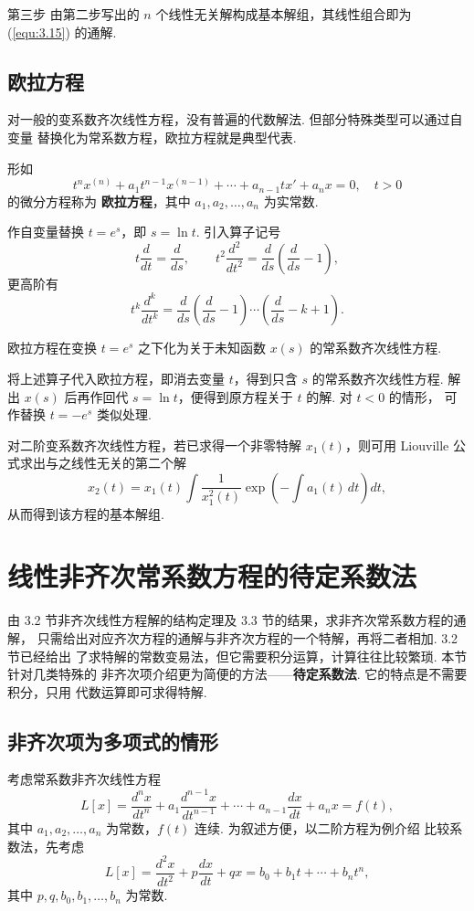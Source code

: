 第三步 由第二步写出的 $n$ 个线性无关解构成基本解组，其线性组合即为
(\ref{equ:3.15}) 的通解.

\subsection{欧拉方程}
对一般的变系数齐次线性方程，没有普遍的代数解法. 但部分特殊类型可以通过自变量
替换化为常系数方程，欧拉方程就是典型代表.

\begin{deff}[(欧拉方程)]
形如
\[
t^n x^{(n)}+a_1t^{n-1}x^{(n-1)}+\cdots+a_{n-1}tx'+a_nx=0,\quad t>0
\]
的微分方程称为 \textbf{欧拉方程}，其中 $a_1,a_2,\dots,a_n$ 为实常数.
\end{deff}

作自变量替换 $t=e^s$，即 $s=\ln t$. 引入算子记号
\[
t\frac{d}{dt}=\frac{d}{ds},\qquad
t^2\frac{d^2}{dt^2}=\frac{d}{ds}\left(\frac{d}{ds}-1\right),
\]
更高阶有
\[
t^k\frac{d^k}{dt^k}
=\frac{d}{ds}\left(\frac{d}{ds}-1\right)\cdots
\left(\frac{d}{ds}-k+1\right).
\]

\begin{thm}\label{thm:3.3.2}
欧拉方程在变换 $t=e^s$ 之下化为关于未知函数 $x(s)$ 的常系数齐次线性方程.
\end{thm}
\begin{pf1}
将上述算子代入欧拉方程，即消去变量 $t$，得到只含 $s$ 的常系数齐次线性方程.
解出 $x(s)$ 后再作回代 $s=\ln t$，便得到原方程关于 $t$ 的解. 对 $t<0$ 的情形，
可作替换 $t=-e^s$ 类似处理.
\end{pf1}

\begin{rmk}
对二阶变系数齐次线性方程，若已求得一个非零特解 $x_1(t)$，则可用 Liouville
公式求出与之线性无关的第二个解
\[
x_2(t)=x_1(t)\int\frac{1}{x_1^2(t)}
\exp\left(-\int a_1(t)\,dt\right)dt,
\]
从而得到该方程的基本解组.
\end{rmk}

\section{线性非齐次常系数方程的待定系数法}\label{sec:3.4}
由 3.2 节非齐次线性方程解的结构定理及 3.3 节的结果，求非齐次常系数方程的通解，
只需给出对应齐次方程的通解与非齐次方程的一个特解，再将二者相加. 3.2 节已经给出
了求特解的常数变易法，但它需要积分运算，计算往往比较繁琐. 本节针对几类特殊的
非齐次项介绍更为简便的方法——\textbf{待定系数法}. 它的特点是不需要积分，只用
代数运算即可求得特解.

\subsection{非齐次项为多项式的情形}
考虑常系数非齐次线性方程
\begin{equation}\label{equ:3.19}
L[x]=\frac{d^n x}{dt^n}+a_1\frac{d^{n-1}x}{dt^{n-1}}+\cdots
+a_{n-1}\frac{dx}{dt}+a_nx=f(t),
\end{equation}
其中 $a_1,a_2,\dots,a_n$ 为常数，$f(t)$ 连续. 为叙述方便，以二阶方程为例介绍
比较系数法，先考虑
\begin{equation}\label{equ:3.20}
L[x]=\frac{d^2x}{dt^2}+p\frac{dx}{dt}+qx
=b_0+b_1t+\cdots+b_nt^n,
\end{equation}
其中 $p,q,b_0,b_1,\dots,b_n$ 为常数.

